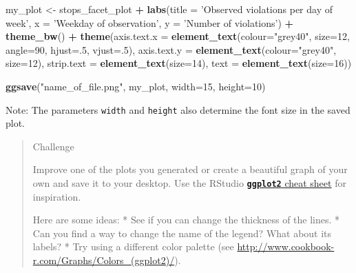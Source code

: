 \documentclass[]{book}
\newenvironment{Shaded}{\begin{snugshade}}{\end{snugshade}}
\newcommand{\DataTypeTok}[1]{\textcolor[rgb]{0.13,0.29,0.53}{#1}}
\newcommand{\DecValTok}[1]{\textcolor[rgb]{0.00,0.00,0.81}{#1}}
\newcommand{\KeywordTok}[1]{\textcolor[rgb]{0.13,0.29,0.53}{\textbf{#1}}}
\newcommand{\NormalTok}[1]{#1}
\newcommand{\OperatorTok}[1]{\textcolor[rgb]{0.81,0.36,0.00}{\textbf{#1}}}
\newcommand{\StringTok}[1]{\textcolor[rgb]{0.31,0.60,0.02}{#1}}
\begin{document}
\begin{Shaded}
\begin{Highlighting}[]
\NormalTok{my_plot <-}\StringTok{ }\NormalTok{stops_facet_plot }\OperatorTok{+}
\StringTok{  }\KeywordTok{labs}\NormalTok{(}\DataTypeTok{title =} \StringTok{'Observed violations per day of week'}\NormalTok{,}
         \DataTypeTok{x =} \StringTok{'Weekday of observation'}\NormalTok{,}
         \DataTypeTok{y =} \StringTok{'Number of violations'}\NormalTok{) }\OperatorTok{+}
\StringTok{  }\KeywordTok{theme_bw}\NormalTok{() }\OperatorTok{+}\StringTok{ }
\StringTok{  }\KeywordTok{theme}\NormalTok{(}\DataTypeTok{axis.text.x =} \KeywordTok{element_text}\NormalTok{(}\DataTypeTok{colour=}\StringTok{"grey40"}\NormalTok{, }\DataTypeTok{size=}\DecValTok{12}\NormalTok{, }\DataTypeTok{angle=}\DecValTok{90}\NormalTok{, }\DataTypeTok{hjust=}\NormalTok{.}\DecValTok{5}\NormalTok{, }\DataTypeTok{vjust=}\NormalTok{.}\DecValTok{5}\NormalTok{),}
        \DataTypeTok{axis.text.y =} \KeywordTok{element_text}\NormalTok{(}\DataTypeTok{colour=}\StringTok{"grey40"}\NormalTok{, }\DataTypeTok{size=}\DecValTok{12}\NormalTok{),}
        \DataTypeTok{strip.text =} \KeywordTok{element_text}\NormalTok{(}\DataTypeTok{size=}\DecValTok{14}\NormalTok{),}
        \DataTypeTok{text =} \KeywordTok{element_text}\NormalTok{(}\DataTypeTok{size=}\DecValTok{16}\NormalTok{))}

\KeywordTok{ggsave}\NormalTok{(}\StringTok{"name_of_file.png"}\NormalTok{, my_plot, }\DataTypeTok{width=}\DecValTok{15}\NormalTok{, }\DataTypeTok{height=}\DecValTok{10}\NormalTok{)}
\end{Highlighting}
\end{Shaded}

Note: The parameters \texttt{width} and \texttt{height} also determine the font size in the saved plot.

\begin{quote}
Challenge

Improve one of the plots you generated or create a beautiful graph
of your own and save it to your desktop. Use the RStudio \href{https://www.rstudio.com/wp-content/uploads/2016/11/ggplot2-cheatsheet-2.1.pdf}{\textbf{\texttt{ggplot2}} cheat sheet} for inspiration.

Here are some ideas:
* See if you can change the thickness of the lines.
* Can you find a way to change the name of the legend? What about its labels?
* Try using a different color palette (see \url{http://www.cookbook-r.com/Graphs/Colors_(ggplot2)/}).
\end{quote}
\end{document}

